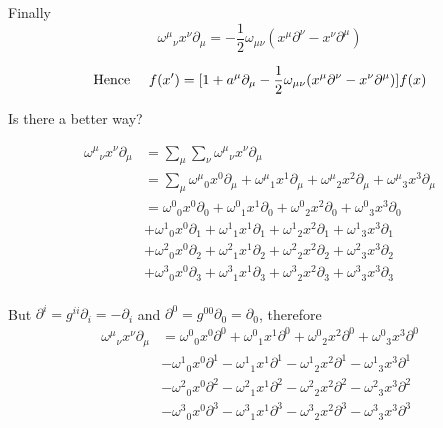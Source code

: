 \documentclass{article}
\begin{document}
Finally
\[{\omega^\mu}_\nu x^\nu \partial_\mu=-\frac{1}{2}\omega_{\mu\nu} (x^\mu \partial^\nu-x^\nu \partial^\mu)\]

\[\qq*{Hence } f(x^\prime)  = [1+a^\mu \partial_\mu -\frac{1}{2}\omega_{\mu\nu} (x^\mu \partial^\nu-x^\nu \partial^\mu)] f(x)\]

Is there a better way?

\begin{align*}
	\omega{}^\mu{}_\nu x^\nu \partial_\mu & =\sum_\mu \sum_\nu \omega{}^\mu{}_\nu x^\nu \partial_\mu                                                                                          \\
	                                      & =\sum_\mu \omega{}^\mu{}_0 x^0 \partial_\mu+\omega{}^\mu{}_1 x^1 \partial_\mu+\omega{}^\mu{}_2 x^2 \partial_\mu+\omega{}^\mu{}_3 x^3 \partial_\mu \\
	                                      & =\omega{}^0{}_0 x^0 \partial_0+\omega{}^0{}_1 x^1 \partial_0+\omega{}^0{}_2 x^2 \partial_0+\omega{}^0{}_3 x^3 \partial_0                          \\
	                                      & +\omega{}^1{}_0 x^0 \partial_1+\omega{}^1{}_1 x^1 \partial_1+\omega{}^1{}_2 x^2 \partial_1+\omega{}^1{}_3 x^3 \partial_1                          \\
	                                      & +\omega{}^2{}_0 x^0 \partial_2+\omega{}^2{}_1 x^1 \partial_2+\omega{}^2{}_2 x^2 \partial_2+\omega{}^2{}_3 x^3 \partial_2                          \\
	                                      & +\omega{}^3{}_0 x^0 \partial_3+\omega{}^3{}_1 x^1 \partial_3+\omega{}^3{}_2 x^2 \partial_3+\omega{}^3{}_3 x^3 \partial_3                          \\
\end{align*}



But $\partial^i=g^{ii}\partial_i=-\partial_i$ and $\partial^0=g^{00}\partial_0=\partial_0$, therefore
\begin{align*}
	{\omega^\mu}_\nu x^\nu \partial_\mu & =	\omega^0{}_0 x^0 \partial^0+\omega^0{}_1 x^1 \partial^0+\omega^0{}_2 x^2 \partial^0+\omega^0{}_3 x^3 \partial^0 \\
	                                    & -	\omega^1{}_0 x^0 \partial^1-\omega^1{}_1 x^1 \partial^1-\omega^1{}_2 x^2 \partial^1-\omega^1{}_3 x^3 \partial^1 \\
	                                    & -	\omega^2{}_0 x^0 \partial^2-\omega^2{}_1 x^1 \partial^2-\omega^2{}_2 x^2 \partial^2-\omega^2{}_3 x^3 \partial^2 \\
	                                    & -	\omega^3{}_0 x^0 \partial^3-\omega^3{}_1 x^1 \partial^3-\omega^3{}_2 x^2 \partial^3-\omega^3{}_3 x^3 \partial^3 \\
\end{align*}
\end{document}
